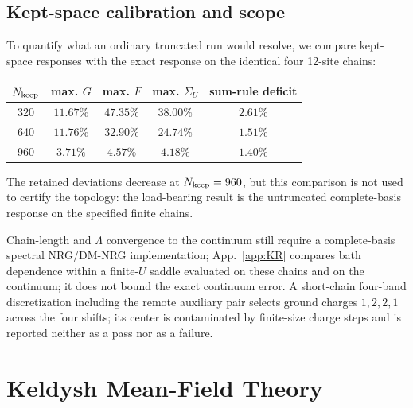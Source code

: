 \documentclass[%
  aps,physrev,onecolumn,10pt,amsmath,amssymb,superscriptaddress,longbibliography,floatfix
]{revtex4-2}
\begin{document}
\subsection{Kept-space calibration and scope}

To quantify what an ordinary truncated run would resolve, we compare
kept-space responses with the exact response on the identical four
12-site chains:
\begin{center}
\begin{tabular}{@{}ccccc@{}}
\toprule
\(N_{\rm keep}\) & max. \(G\) & max. \(F\) &
max. \(\Sigma_U\) & sum-rule deficit\\
\midrule
320 & \(11.67\%\) & \(47.35\%\) & \(38.00\%\) & \(2.61\%\)\\
640 & \(11.76\%\) & \(32.90\%\) & \(24.74\%\) & \(1.51\%\)\\
960 & \(3.71\%\) & \(4.57\%\) & \(4.18\%\) & \(1.40\%\)\\
\bottomrule
\end{tabular}
\end{center}
The retained deviations decrease at \(N_{\rm keep}=960\), but this comparison
is not used to certify the topology:
the load-bearing result is the untruncated complete-basis response on the
specified finite chains.

Chain-length and $\Lambda$ convergence to the continuum still require a complete-basis spectral NRG/DM-NRG implementation; App.~\ref{app:KR} compares bath dependence within a finite-$U$ saddle evaluated on these chains and on the continuum; it does not bound the exact continuum error.  A short-chain four-band discretization including the remote auxiliary pair selects ground charges $1,2,2,1$ across the four shifts; its center is contaminated by finite-size charge steps and is reported neither as a pass nor as a failure.

\section{Keldysh Mean-Field Theory}
\label{app:keldysh}
\end{document}
